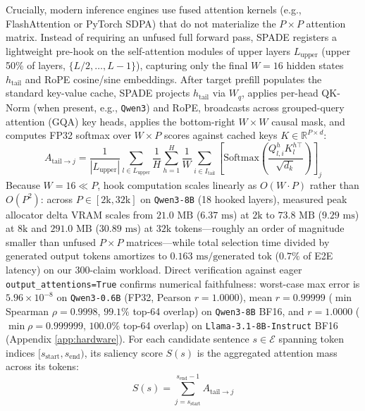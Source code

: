 \documentclass[11pt]{article}
\begin{document}
Crucially, modern inference engines use fused attention kernels (e.g., FlashAttention or PyTorch SDPA) that do not materialize the $P \times P$ attention matrix. Instead of requiring an unfused full forward pass, SPADE registers a lightweight pre-hook on the self-attention modules of upper layers $L_{\text{upper}}$ (upper 50\% of layers, $\{L/2, \dots, L-1\}$), capturing only the final $W=16$ hidden states $h_{\text{tail}}$ and RoPE cosine/sine embeddings. After target prefill populates the standard key-value cache, SPADE projects $h_{\text{tail}}$ via $W_q$, applies per-head QK-Norm (when present, e.g., \texttt{Qwen3}) and RoPE, broadcasts across grouped-query attention (GQA) key heads, applies the bottom-right $W \times W$ causal mask, and computes FP32 softmax over $W \times P$ scores against cached keys $K \in \mathbb{R}^{P \times d}$:
\begin{equation}
A_{\text{tail} \to j} = \frac{1}{|L_{\text{upper}}|} \sum_{l \in L_{\text{upper}}} \frac{1}{H} \sum_{h=1}^H \frac{1}{W} \sum_{i \in I_{\text{tail}}} \left[\text{Softmax}\left(\frac{Q_{l, i}^h K_{l}^{h\top}}{\sqrt{d_k}}\right)\right]_j
\end{equation}
Because $W=16 \ll P$, hook computation scales linearly as $O(W \cdot P)$ rather than $O(P^2)$: across $P \in [2\text{k}, 32\text{k}]$ on \texttt{Qwen3-8B} (18 hooked layers), measured peak allocator delta VRAM scales from $21.0\text{ MB}$ ($6.37\text{ ms}$) at $2\text{k}$ to $73.8\text{ MB}$ ($9.29\text{ ms}$) at $8\text{k}$ and $291.0\text{ MB}$ ($30.89\text{ ms}$) at $32\text{k}$ tokens---roughly an order of magnitude smaller than unfused $P \times P$ matrices---while total selection time divided by generated output tokens amortizes to $0.163\text{ ms/generated tok}$ ($0.7\%$ of E2E latency) on our 300-claim workload. Direct verification against eager \texttt{output\_attentions=True} confirms numerical faithfulness: worst-case max error is $5.96 \times 10^{-8}$ on \texttt{Qwen3-0.6B} (FP32, Pearson $r = 1.0000$), mean $r = 0.99999$ ($\min$ Spearman $\rho = 0.9998$, $99.1\%$ top-64 overlap) on \texttt{Qwen3-8B} BF16, and $r = 1.0000$ ($\min \rho = 0.999999$, $100.0\%$ top-64 overlap) on \texttt{Llama-3.1-8B-Instruct} BF16 (Appendix \ref{app:hardware}). For each candidate sentence $s \in \mathcal{E}$ spanning token indices $[s_{\text{start}}, s_{\text{end}})$, its saliency score $S(s)$ is the aggregated attention mass across its tokens:
\begin{equation}
S(s) = \sum_{j = s_{\text{start}}}^{s_{\text{end}} - 1} A_{\text{tail} \to j}
\end{equation}
\end{document}
